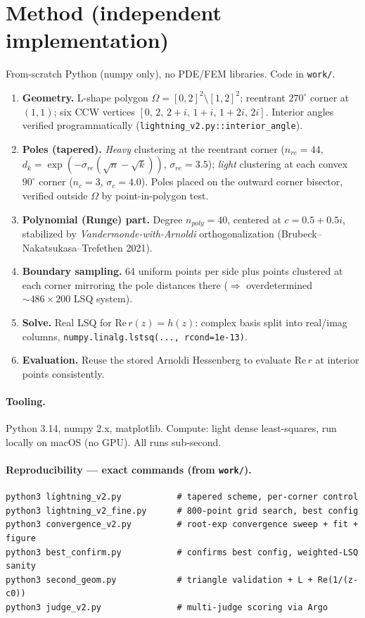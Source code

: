 \documentclass[11pt]{article}
\begin{document}
\section{Method (independent implementation)}
From-scratch Python (numpy only), no PDE/FEM libraries. Code in \texttt{work/}.
\begin{enumerate}
  \item \textbf{Geometry.} L-shape polygon $\Omega=[0,2]^2\setminus[1,2]^2$;
        reentrant $270^\circ$ corner at $(1,1)$; six CCW vertices
        $[0,\,2,\,2+i,\,1+i,\,1+2i,\,2i]$. Interior angles verified
        programmatically (\texttt{lightning\_v2.py::interior\_angle}).
  \item \textbf{Poles (tapered).} \emph{Heavy} clustering at the reentrant
        corner ($n_{re}=44$, $d_k=\exp(-\sigma_{re}(\sqrt n-\sqrt k))$,
        $\sigma_{re}=3.5$); \emph{light} clustering at each convex $90^\circ$
        corner ($n_c=3$, $\sigma_c=4.0$). Poles placed on the outward corner
        bisector, verified outside $\Omega$ by point-in-polygon test.
  \item \textbf{Polynomial (Runge) part.} Degree $n_{poly}=40$, centered at
        $c=0.5+0.5i$, stabilized by \emph{Vandermonde-with-Arnoldi}
        orthogonalization (Brubeck--Nakatsukasa--Trefethen 2021).
  \item \textbf{Boundary sampling.} 64 uniform points per side plus points
        clustered at each corner mirroring the pole distances there
        ($\Rightarrow$ overdetermined $\sim 486\times 200$ LSQ system).
  \item \textbf{Solve.} Real LSQ for $\mathrm{Re}\, r(z)=h(z)$: complex basis
        split into real/imag columns, \texttt{numpy.linalg.lstsq(..., rcond=1e-13)}.
  \item \textbf{Evaluation.} Reuse the stored Arnoldi Hessenberg to evaluate
        $\mathrm{Re}\, r$ at interior points consistently.
\end{enumerate}

\paragraph{Tooling.} Python 3.14, numpy 2.x, matplotlib. Compute: light dense
least-squares, run locally on macOS (no GPU). All runs sub-second.

\paragraph{Reproducibility --- exact commands (from \texttt{work/}).}
\begin{verbatim}
python3 lightning_v2.py           # tapered scheme, per-corner control
python3 lightning_v2_fine.py      # 800-point grid search, best config
python3 convergence_v2.py         # root-exp convergence sweep + fit + figure
python3 best_confirm.py           # confirms best config, weighted-LSQ sanity
python3 second_geom.py            # triangle validation + L + Re(1/(z-c0))
python3 judge_v2.py               # multi-judge scoring via Argo
\end{verbatim}
\end{document}

